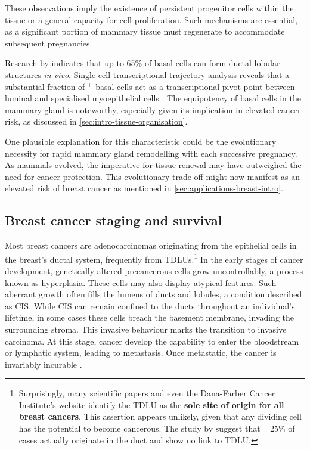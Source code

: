 These observations imply the existence of persistent progenitor cells within the tissue or a general capacity for cell proliferation. Such mechanisms are essential, as a significant portion of mammary tissue must regenerate to accommodate subsequent pregnancies.


Research by \textcite{Prater2014-qd} indicates that up to 65\% of basal cells can form ductal-lobular structures \emph{in vivo}. Single-cell transcriptional trajectory analysis reveals that a substantial fraction of $^+$ basal cells act as a transcriptional pivot point between luminal and specialised myoepithelial cells \parencite{Nguyen2018-jl}. The equipotency of basal cells in the mammary gland is noteworthy, especially given its implication in elevated cancer risk, as discussed in \cref{sec:intro-tissue-organisation}.

One plausible explanation for this characteristic could be the evolutionary necessity for rapid mammary gland remodelling with each successive pregnancy. As mammals evolved, the imperative for tissue renewal may have outweighed the need for cancer protection. This evolutionary trade-off might now manifest as an elevated risk of breast cancer as mentioned in \cref{sec:applications-breast-intro}.

\subsection{Breast cancer staging and survival}

Most breast cancers are adenocarcinomas originating from the epithelial cells in the breast's ductal system, frequently from \acp{TDLU}.\footnote{Surprisingly, many scientific papers and even the Dana-Farber Cancer Institute's \href{https://www.dana-farber.org/health-library/articles/what-is-lobular-breast-cancer-}{website} identify the \ac{TDLU} as the  \textbf{sole site of origin for all breast cancers}. This assertion appears unlikely, given that any dividing cell has the potential to become cancerous. The study by \textcite{Tabar2014-ea} suggest that ~ 25\% of cases actually originate in the duct and show no link to \ac{TDLU}.} In the early stages of cancer development, genetically altered precancerous cells grow uncontrollably, a process known as hyperplasia. These cells may also display atypical features. Such aberrant growth often fills the lumens of ducts and lobules, a condition described as \acf{CIS}. While \ac{CIS} can remain confined to the ducts throughout an individual's lifetime, in some cases these cells breach the basement membrane, invading the surrounding stroma. This invasive behaviour marks the transition to invasive carcinoma. At this stage, cancer develop the capability to enter the bloodstream or lymphatic system, leading to metastasis. Once metastatic, the cancer is invariably incurable .

